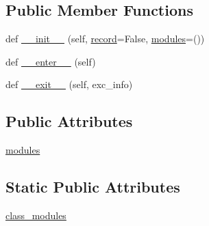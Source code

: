 \subsection*{Public Member Functions}
\begin{DoxyCompactItemize}
\item 
def \hyperlink{classnumpy_1_1testing_1_1__private_1_1utils_1_1clear__and__catch__warnings_afebf5316b2edd866b61e921f6f5b5cb5}{\+\_\+\+\_\+init\+\_\+\+\_\+} (self, \hyperlink{classnumpy_1_1core_1_1records_1_1record}{record}=False, \hyperlink{classnumpy_1_1testing_1_1__private_1_1utils_1_1clear__and__catch__warnings_af2c69b1bfe7ee58b2cef999af7ded367}{modules}=())
\item 
def \hyperlink{classnumpy_1_1testing_1_1__private_1_1utils_1_1clear__and__catch__warnings_afaffe0c25a3d8c6b5348ead864ddc6fd}{\+\_\+\+\_\+enter\+\_\+\+\_\+} (self)
\item 
def \hyperlink{classnumpy_1_1testing_1_1__private_1_1utils_1_1clear__and__catch__warnings_ab9e91e927256143cd3839ceaebac3f91}{\+\_\+\+\_\+exit\+\_\+\+\_\+} (self, exc\+\_\+info)
\end{DoxyCompactItemize}
\subsection*{Public Attributes}
\begin{DoxyCompactItemize}
\item 
\hyperlink{classnumpy_1_1testing_1_1__private_1_1utils_1_1clear__and__catch__warnings_af2c69b1bfe7ee58b2cef999af7ded367}{modules}
\end{DoxyCompactItemize}
\subsection*{Static Public Attributes}
\begin{DoxyCompactItemize}
\item 
\hyperlink{classnumpy_1_1testing_1_1__private_1_1utils_1_1clear__and__catch__warnings_a3690f1daaee94106f95c046d3e95b21a}{class\+\_\+modules}
\end{DoxyCompactItemize}


